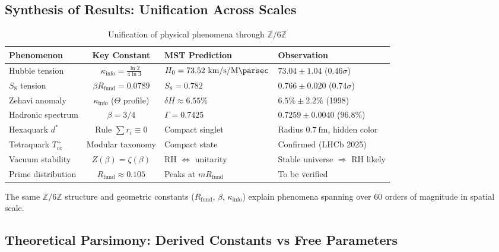 \documentclass[11pt, a4paper]{article}
\theoremstyle{plain}
\theoremstyle{definition}
\newcommand{\Zmod}{\mathbb{Z}/6\mathbb{Z}}
\newcommand{\Rfactor}{R_{\text{fund}}}
\newcommand{\Kinfo}{\kappa_{\text{info}}}
\begin{document}
\subsection{Synthesis of Results: Unification Across Scales}

\begin{table}[H]
\centering
\caption{Unification of physical phenomena through $\Zmod$}
\label{tab:unification_results}
\begin{tabular}{p{4cm}cp{3cm}p{3cm}}
\toprule
\textbf{Phenomenon} & \textbf{Key Constant} & \textbf{MST Prediction} & \textbf{Observation} \\
\midrule
Hubble tension & $\Kinfo = \frac{\ln 2}{4\ln 3}$ & $H_0 = 73.52\ \si{\kilo\meter\per\second\per\mega\parsec}$ & $73.04 \pm 1.04$ ($0.46\sigma$) \\
$S_8$ tension & $\beta\Rfactor = 0.0789$ & $S_8 = 0.782$ & $0.766 \pm 0.020$ ($0.74\sigma$) \\
Zehavi anomaly & $\Kinfo$ ($\Theta$ profile) & $\delta H \approx 6.55\%$ & $6.5\% \pm 2.2\%$ (1998) \\
\addlinespace
Hadronic spectrum & $\beta = 3/4$ & $\Gamma = 0.7425$ & $0.7259 \pm 0.0040$ ($96.8\%$) \\
Hexaquark $d^*$ & Rule $\sum r_i \equiv 0$ & Compact singlet & Radius $0.7\ \si{\femto\meter}$, hidden color \\
Tetraquark $T_{cc}^+$ & Modular taxonomy & Compact state & Confirmed (LHCb 2025) \\
\addlinespace
Vacuum stability & $Z(\beta)=\zeta(\beta)$ & RH $\Leftrightarrow$ unitarity & Stable universe $\Rightarrow$ RH likely \\
Prime distribution & $\Rfactor \approx 0.105$ & Peaks at $m\Rfactor$ & To be verified \\
\bottomrule
\end{tabular}
\end{table}

The same $\Zmod$ structure and geometric constants ($\Rfactor$, $\beta$, $\Kinfo$) explain phenomena spanning over 60 orders of magnitude in spatial scale.

\subsection{Theoretical Parsimony: Derived Constants vs Free Parameters}
\end{document}
